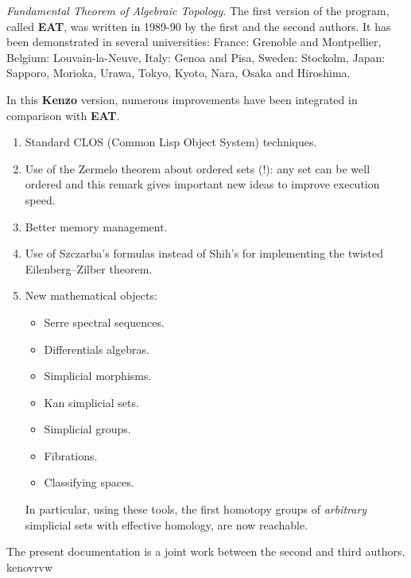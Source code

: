 \emph{Fundamental Theorem of   Algebraic  Topology}. The first version of the program, 
called {\bf EAT}, was written in  1989-90 by the  first and the second authors.
It  has been demonstrated in  several universities: France: Grenoble and
Montpellier, Belgium:  Louvain-la-Neuve, Italy: Genoa and Pisa, 
Sweden: Stockolm, Japan:
Sapporo, Morioka, Urawa, Tokyo,  Kyoto, Nara, Osaka and Hiroshima. 
\par
In this {\bf Kenzo} version, numerous improvements have been integrated in comparison with
{\bf EAT}.
\begin{enumerate}
\item Standard CLOS (Common Lisp Object System) techniques.
\item Use of the Zermelo theorem about ordered sets (!): any set can be
well ordered and this remark gives important new ideas to improve
execution speed.
\item Better memory management.
\item Use of Szczarba's formulas instead of Shih's for implementing the twisted
Eilenberg--Zilber theorem.
\item New mathematical objects:
\begin{itemize}
\item Serre spectral sequences.
\item Differentials algebras.
\item Simplicial morphisms.
\item Kan simplicial sets.
\item Simplicial groups.
\item Fibrations.
\item Classifying spaces.
\end{itemize}
In particular, using these tools, the first homotopy groups of {\em arbitrary} 
simplicial sets with effective homology, are now reachable.
\end{enumerate}
\par
The present documentation is a joint work between the second and third authors.
\cleardoublepage
 {kenovrvw}
\cleardoublepage

\begin{theindex}

\end{theindex}

